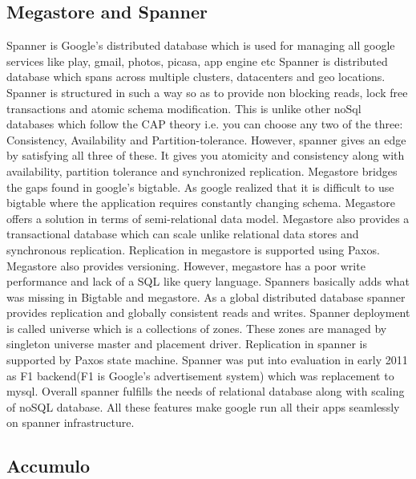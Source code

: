 \subsection{ Megastore and Spanner}

     Spanner \cite{corbett-spanner} is Google's distributed database
     which is used for managing all google services like play, gmail,
     photos, picasa, app engine etc Spanner is distributed database
     which spans across multiple clusters, datacenters and geo
     locations.  Spanner is structured in such a way so as to provide
     non blocking reads, lock free transactions and atomic schema
     modification. This is unlike other noSql databases which follow
     the CAP theory i.e. you can choose any two of the three:
     Consistency, Availability and Partition-tolerance. However,
     spanner gives an edge by satisfying all three of these. It gives
     you atomicity and consistency along with availability, partition
     tolerance and synchronized replication.  Megastore bridges the
     gaps found in google's bigtable. As google realized that it is
     difficult to use bigtable where the application requires
     constantly changing schema. Megastore offers a solution in terms
     of semi-relational data model.  Megastore
     \cite{www-magastore-spanner} also provides a transactional
     database which can scale unlike relational data stores and
     synchronous replication.  Replication in megastore is supported
     using Paxos. Megastore also provides versioning. However,
     megastore has a poor write performance and lack of a SQL like
     query language. Spanners basically adds what was missing in
     Bigtable and megastore. As a global distributed database spanner
     provides replication and globally consistent reads and
     writes. Spanner deployment is called universe which is a
     collections of zones. These zones are managed by singleton
     universe master and placement driver. Replication in spanner is
     supported by Paxos state machine. Spanner was put into evaluation
     in early 2011 as F1 backend(F1 is Google's advertisement system)
     which was replacement to mysql. Overall spanner fulfills the needs
     of relational database along with scaling of noSQL database.  All
     these features make google run all their apps seamlessly on
     spanner infrastructure.

\subsection{ Accumulo}

